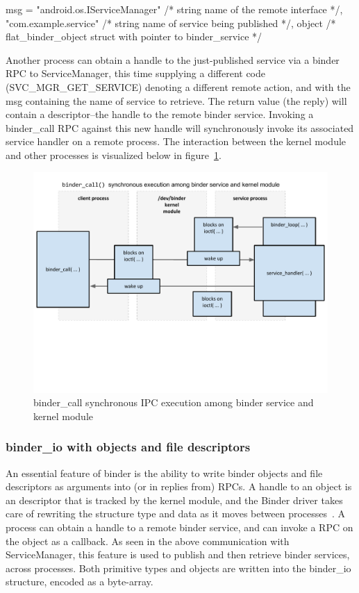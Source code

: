 \documentclass[prodmode]{acmlarge}
\begin{document}
\begin{snippet}[caption=contents of msg passed into binder\_call]
msg = {
  "android.os.IServiceManager" /* string name of the remote interface */,
  "com.example.service" /* string name of service being published */,
  object /* flat_binder_object struct with pointer to binder_service */
}
\end{snippet}

Another process can obtain a handle to the just-published service via a binder RPC to ServiceManager, this time supplying a different code (SVC\_MGR\_GET\_SERVICE) denoting a different remote action, and with the msg containing the name of service to retrieve. The return value (the reply) will contain a descriptor--the handle to the remote binder service. Invoking a binder\_call RPC against this new handle will synchronously invoke its associated service handler on a remote process. The interaction between the kernel module and other processes is visualized below in figure~\ref{fig:binder_call}.
\begin{figure}[h]
\centering
\includegraphics[width=\textwidth]{drawings/binder_call.pdf}
\caption{binder\_call synchronous IPC execution among binder service and kernel module}
\label{fig:binder_call}
\end{figure}

\subsubsection{binder\_io with objects and file descriptors}
An essential feature of binder is the ability to write binder objects and file descriptors as arguments into (or in replies from) RPCs. A handle to an object is an descriptor that is tracked by the kernel module, and the Binder driver takes care of rewriting the structure type and data as it moves between processes~\cite{BinderSourceComment}. A process can obtain a handle to a remote binder service, and can invoke a RPC on the object as a callback. As seen in the above communication with ServiceManager, this feature is used to publish and then retrieve binder services, across processes. Both primitive types and objects are written into the binder\_io structure, encoded as a byte-array.
\end{document}
